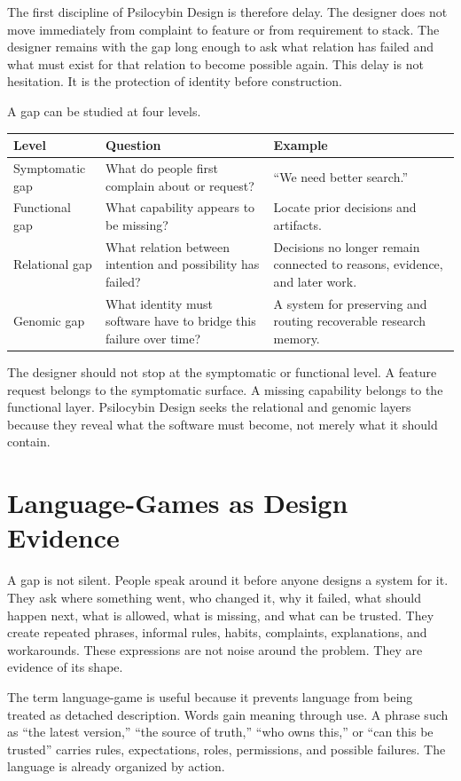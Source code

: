 \documentclass[11pt]{article}
\begin{document}
The first discipline of Psilocybin Design is therefore delay. The designer does not move immediately from complaint to feature or from requirement to stack. The designer remains with the gap long enough to ask what relation has failed and what must exist for that relation to become possible again. This delay is not hesitation. It is the protection of identity before construction.

A gap can be studied at four levels.

\begin{longtable}{|p{}|p{}|p{}|}
\hline
\textbf{Level} & \textbf{Question} & \textbf{Example} \\
\hline
Symptomatic gap & What do people first complain about or request? & ``We need better search.'' \\
\hline
Functional gap & What capability appears to be missing? & Locate prior decisions and artifacts. \\
\hline
Relational gap & What relation between intention and possibility has failed? & Decisions no longer remain connected to reasons, evidence, and later work. \\
\hline
Genomic gap & What identity must software have to bridge this failure over time? & A system for preserving and routing recoverable research memory. \\
\hline
\end{longtable}

The designer should not stop at the symptomatic or functional level. A feature request belongs to the symptomatic surface. A missing capability belongs to the functional layer. Psilocybin Design seeks the relational and genomic layers because they reveal what the software must become, not merely what it should contain.

\section{Language-Games as Design Evidence}

A gap is not silent. People speak around it before anyone designs a system for it. They ask where something went, who changed it, why it failed, what should happen next, what is allowed, what is missing, and what can be trusted. They create repeated phrases, informal rules, habits, complaints, explanations, and workarounds. These expressions are not noise around the problem. They are evidence of its shape.

The term language-game is useful because it prevents language from being treated as detached description. Words gain meaning through use. A phrase such as ``the latest version,'' ``the source of truth,'' ``who owns this,'' or ``can this be trusted'' carries rules, expectations, roles, permissions, and possible failures. The language is already organized by action.
\end{document}
